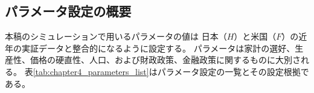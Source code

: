 
\subsection{パラメータ設定の概要}
\label{sec:chapter4_parameters_overview}
本稿のシミュレーションで用いるパラメータの値は
日本（\(H\)）と米国（\(F\)）の近年の実証データと整合的になるように設定する。
パラメータは家計の選好、生産性、価格の硬直性、人口、および財政政策、金融政策に関するものに大別される。
表\ref{tab:chapter4_parameters_list}はパラメータ設定の一覧とその設定根拠である。